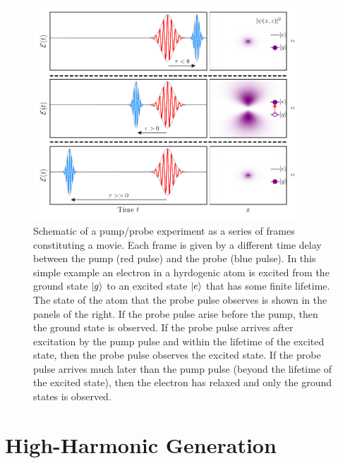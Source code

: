 \begin{figure}
	\centering
	\includegraphics[width=0.9\textwidth]{figures/Introduction/pump_probe.pdf}
	\caption[Schematic of as pump/probe experiment]{Schematic of a pump/probe experiment as a series of frames constituting a movie.  Each frame is given by a different time delay between the pump (red pulse) and the probe (blue pulse).  In this simple example an electron in a hyrdogenic atom is excited from the ground state $\ket{g}$ to an excited state $\ket{e}$ that has some finite lifetime.  The state of the atom that the probe pulse observes is shown in the panels of the right.  If the probe pulse arise before the pump, then the ground state is observed.  If the probe pulse arrives after excitation by the pump pulse and within the lifetime of the excited state, then the probe pulse observes the excited state.  If the probe pulse arrives much later than the pump pulse (beyond the lifetime of the excited state), then the electron has relaxed and only the ground states is observed.}
	\label{fig:pump_probe}
\end{figure}

\section{High-Harmonic Generation}
\label{intro_HHG}


